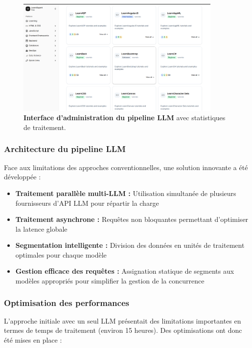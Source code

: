 \begin{figure}[H]
  \centering
  \includegraphics[width=0.9\textwidth,keepaspectratio]{week_3_img/Screenshot 2025-05-20 164411.png}
  \caption{\textbf{Interface d'administration du pipeline LLM} avec statistiques de traitement.}
  \label{fig:llm_pipeline}
\end{figure}

\subsubsection{Architecture du pipeline LLM}

Face aux limitations des approches conventionnelles, une solution innovante a été développée :

\begin{itemize}
  \item \textbf{Traitement parallèle multi-LLM :} Utilisation simultanée de plusieurs fournisseurs d'API LLM pour répartir la charge
  \item \textbf{Traitement asynchrone :} Requêtes non bloquantes permettant d'optimiser la latence globale
  \item \textbf{Segmentation intelligente :} Division des données en unités de traitement optimales pour chaque modèle
  \item \textbf{Gestion efficace des requêtes :} Assignation statique de segments aux modèles appropriés pour simplifier la gestion de la concurrence
\end{itemize}

\subsubsection{Optimisation des performances}

L'approche initiale avec un seul LLM présentait des limitations importantes en termes de temps de traitement (environ 15 heures). Des optimisations ont donc été mises en place :

